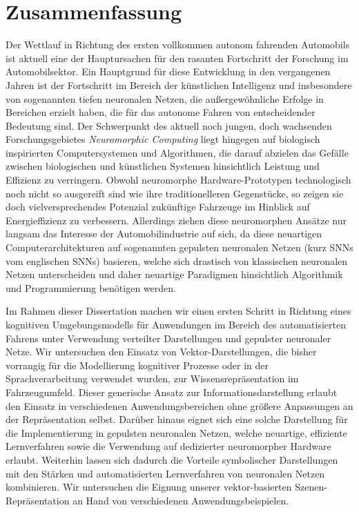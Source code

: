 \chapter*{Zusammenfassung}

Der Wettlauf in Richtung des ersten vollkommen autonom fahrenden Automobils ist aktuell eine der Hauptursachen f\"ur den rasanten Fortschritt der Forschung im Automobilsektor.
Ein Hauptgrund f\"ur diese Entwicklung in den vergangenen Jahren ist der Fortschritt im Bereich der k\"unstlichen Intelligenz und insbesondere von sogenannten tiefen neuronalen Netzen, die au{\ss}ergew\"ohnliche Erfolge in Bereichen erzielt haben, die f\"ur das autonome Fahren von entscheidender Bedeutung sind.
Der Schwerpunkt des aktuell noch jungen, doch wachsenden Forschungsgebietes \emph{Neuromorphic Computing} liegt hingegen auf biologisch inspirierten Computersystemen und Algorithmen, die darauf abzielen das Gef\"alle zwischen biologischen und k\"unstlichen Systemen hinsichtlich Leistung und Effizienz zu verringern.
Obwohl neuromorphe Hardware-Prototypen technologisch noch nicht so ausgereift sind wie ihre traditionelleren Gegenst\"ucke, so zeigen sie doch vielversprechendes Potenzial zuk\"unftige Fahrzeuge im Hinblick auf Energieffizienz zu verbessern.
Allerdings ziehen diese neuromorphen Ans\"atze nur langsam das Interesse der Automobilindustrie auf sich, da diese neuartigen Computerarchitekturen auf sogenannten gepulsten neuronalen Netzen (kurz \acsp{SNN} vom englischen \aclp{SNN}) basieren, welche sich drastisch von klassischen neuronalen Netzen unterscheiden und daher neuartige Paradigmen hinsichtlich Algorithmik und Programmierung ben\"otigen werden.

Im Rahmen dieser Dissertation machen wir einen ersten Schritt in Richtung eines kognitiven Umgebungsmodells f\"ur Anwendungen im Bereich des automatisierten Fahrens unter Verwendung verteilter Darstellungen und gepulster neuronaler Netze.
Wir untersuchen den Einsatz von Vektor-Darstellungen, die bisher vorrangig f\"ur die Modellierung kognitiver Prozesse oder in der Sprachverarbeitung verwendet wurden, zur Wissensrepr\"asentation im Fahrzeugumfeld.
Dieser generische Ansatz zur Informationsdarstellung erlaubt den Einsatz in verschiedenen Anwendungsbereichen ohne gr\"o{\ss}ere Anpassungen an der Repr\"asentation selbst.
Dar\"uber hinaus eignet sich eine solche Darstellung f\"ur die Implementierung in gepulsten neuronalen Netzen, welche neuartige, effiziente Lernverfahren sowie die Verwendung auf dedizierter neuromorpher Hardware erlaubt.
Weiterhin lassen sich dadurch die Vorteile symbolischer Darstellungen mit den St\"arken und automatisierten Lernverfahren von neuronalen Netzen kombinieren.
Wir untersuchen die Eignung unserer vektor-basierten Szenen-Repr\"asentation an Hand von verschiedenen Anwendungsbeispielen.

